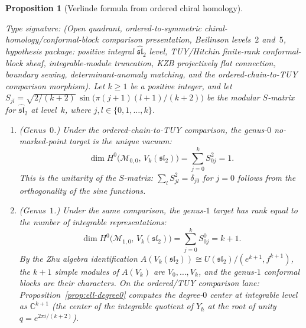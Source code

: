 \documentclass[11pt,reqno]{amsart}
\newtheorem{proposition}[theorem]{Proposition}
\theoremstyle{definition}
\theoremstyle{remark}
\newcommand{\cM}{\mathcal{M}}
\newcommand{\CC}{\mathbb{C}}
\numberwithin{equation}{section}
\providecommand{\ClaimStatusConditional}{}
\begin{document}
\begin{proposition}[Verlinde formula from ordered chiral
homology]
\label{prop:verlinde-from-ordered}
\ClaimStatusConditional
Type signature: \textup{(}Open quadrant, ordered-to-symmetric
chiral-homology/conformal-block comparison presentation, Beilinson
levels~$2$ and~$5$, hypothesis package: positive integral
\(\widehat{\mathfrak{sl}}_2\) level, TUY/Hitchin finite-rank
conformal-block sheaf, integrable-module truncation, KZB
projectively flat connection, boundary sewing, determinant-anomaly
matching, and the ordered-chain-to-TUY comparison morphism\textup{)}.
Let $k \geq 1$ be a positive integer, and let
$S_{jl} = \sqrt{2/(k+2)}\,\sin\!\bigl(\pi(j+1)(l+1)/(k+2)\bigr)$
be the modular $S$-matrix for $\widehat{\mathfrak{sl}}_2$ at
level~$k$, where $j, l \in \{0, 1, \ldots, k\}$.
\begin{enumerate}[label=\textup{(\roman*)}]
\item \textup{(Genus~$0$.)}
  Under the ordered-chain-to-TUY comparison, the genus-$0$
  no-marked-point target is the unique vacuum:
  \begin{equation}\label{eq:verlinde-g0}
    \dim H^0\!\bigl(\cM_{0,0},\, V_k(\mathfrak{sl}_2)\bigr)
    = \sum_{j=0}^{k} S_{0j}^2 = 1.
  \end{equation}
  This is the unitarity of the $S$-matrix:
  $\sum_l S_{jl}^2 = \delta_{j0}$ for $j = 0$ follows from
  the orthogonality of the sine functions.

\item \textup{(Genus~$1$.)}
  Under the same comparison, the genus-$1$ target has rank equal
  to the number of integrable representations:
  \begin{equation}\label{eq:verlinde-g1}
    \dim H^0\!\bigl(\cM_{1,0},\, V_k(\mathfrak{sl}_2)\bigr)
    = \sum_{j=0}^{k} S_{0j}^0 = k + 1.
  \end{equation}
  By the Zhu algebra identification $A(V_k(\mathfrak{sl}_2))
  \cong U(\mathfrak{sl}_2)/(e^{k+1}, f^{k+1})$, the $k+1$
  simple modules of $A(V_k)$ are $V_0, \ldots, V_k$, and
  the genus-$1$ conformal blocks are their characters.
  On the ordered/TUY comparison lane:
  Proposition~\textup{\ref{prop:ell-degree0}} computes the
  degree-$0$ center at integrable level as $\CC^{k+1}$
  \textup{(}the center of the integrable quotient of $Y_\hbar$
  at the root of unity $q = e^{2\pi i/(k+2)}$\textup{)}.


\end{enumerate}
\end{proposition}
\end{document}
